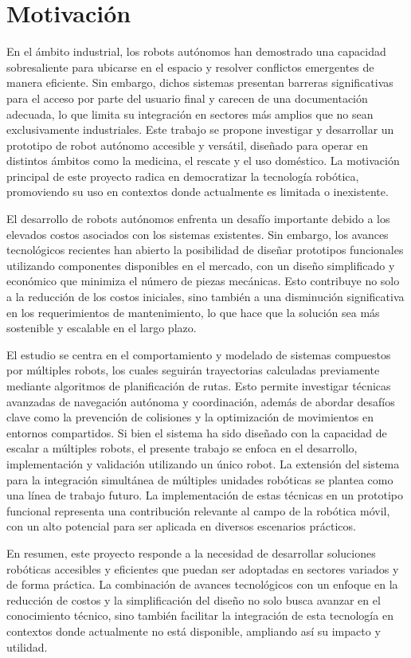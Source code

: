 \newpage
\chapter*{Motivación}

En el ámbito industrial, los robots autónomos han demostrado una capacidad sobresaliente para ubicarse en el espacio y resolver conflictos emergentes de manera eficiente. Sin embargo, dichos sistemas presentan barreras significativas para el acceso por parte del usuario final y carecen de una documentación adecuada, lo que limita su integración en sectores más amplios que no sean exclusivamente industriales. Este trabajo se propone investigar y desarrollar un prototipo de robot autónomo accesible y versátil, diseñado para operar en distintos ámbitos como la medicina, el rescate y el uso doméstico. La motivación principal de este proyecto radica en democratizar la tecnología robótica, promoviendo su uso en contextos donde actualmente es limitada o inexistente.

El desarrollo de robots autónomos enfrenta un desafío importante debido a los elevados costos asociados con los sistemas existentes. Sin embargo, los avances tecnológicos recientes han abierto la posibilidad de diseñar prototipos funcionales utilizando componentes disponibles en el mercado, con un diseño simplificado y económico que minimiza el número de piezas mecánicas. Esto contribuye no solo a la reducción de los costos iniciales, sino también a una disminución significativa en los requerimientos de mantenimiento, lo que hace que la solución sea más sostenible y escalable en el largo plazo.

El estudio se centra en el comportamiento y modelado de sistemas compuestos por múltiples robots, los cuales seguirán trayectorias calculadas previamente mediante algoritmos de planificación de rutas. Esto permite investigar técnicas avanzadas de navegación autónoma y coordinación, además de abordar desafíos clave como la prevención de colisiones y la optimización de movimientos en entornos compartidos. Si bien el sistema ha sido diseñado con la capacidad de escalar a múltiples robots, el presente trabajo se enfoca en el desarrollo, implementación y validación utilizando un único robot. La extensión del sistema para la integración simultánea de múltiples unidades robóticas se plantea como una línea de trabajo futuro. La implementación de estas técnicas en un prototipo funcional representa una contribución relevante al campo de la robótica móvil, con un alto potencial para ser aplicada en diversos escenarios prácticos.

En resumen, este proyecto responde a la necesidad de desarrollar soluciones robóticas accesibles y eficientes que puedan ser adoptadas en sectores variados y de forma práctica. La combinación de avances tecnológicos con un enfoque en la reducción de costos y la simplificación del diseño no solo busca avanzar en el conocimiento técnico, sino también facilitar la integración de esta tecnología en contextos donde actualmente no está disponible, ampliando así su impacto y utilidad.
